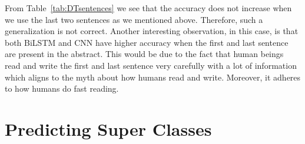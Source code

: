 From Table~\ref{tab:DTsentences} we see that the accuracy does not increase when we use the last two sentences as we mentioned above. Therefore, such a generalization is not correct. Another interesting observation, in this case, is that both BiLSTM and CNN have higher accuracy when the first and last sentence are present in the abstract. This would be due to the fact that human beings read and write the first and last sentence very carefully with a lot of information which aligns to the myth about how humans read and write. Moreover, it adheres to how humans do fast reading.


\section{Predicting Super Classes}
 
